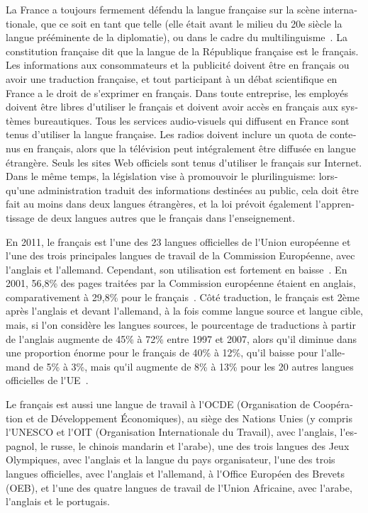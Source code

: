 \documentclass[]{../metanetpaper}
\begin{document}
\begin{french}
\begin{multicols}{2}
La France a toujours fermement défendu la langue française sur la
scène internationale, que ce soit en tant que telle (elle était avant
le milieu du 20e siècle la langue prééminente de la diplomatie), ou
dans le cadre du multilinguisme~\cite{multilinguisme}. La constitution
française dit que la langue de la République française est le
français. Les informations aux consommateurs et la publicité doivent
être en français ou avoir une traduction française, et tout
participant à un débat scientifique en France a le droit de s{\mbox
 '}exprimer en français. Dans toute entreprise, les employés doivent
être libres d{\mbox '}utiliser le français et doivent avoir accès en
français aux systèmes bureautiques. Tous les services audio-visuels
qui diffusent en France sont tenus d'utiliser la langue française. Les
radios doivent inclure un quota de contenus en français, alors que la
télévision peut intégralement être diffusée en langue étrangère. Seuls
les sites Web officiels sont tenus d{\mbox '}utiliser le français sur
Internet. Dans le même temps, la législation vise à promouvoir le
plurilinguisme: lorsqu{\mbox '}une administration traduit des
informations destinées au public, cela doit être fait au moins dans
deux langues étrangères, et la loi prévoit également l{\mbox '}apprentissage 
de deux langues autres que le français dans l{\mbox '}enseignement.

En 2011, le français est l{\mbox '}une des 23 langues officielles de
l{\mbox '}Union européenne et l{\mbox '}une des trois principales
langues de travail de la Commission Européenne, avec l{\mbox '}anglais
et l{\mbox '}allemand. Cependant, son utilisation est fortement en
baisse~\cite{baisse}. En 2001, 56,8\% des pages traitées par la
Commission européenne étaient en anglais, comparativement à 29,8\%
pour le français~\cite{comparativement}. Côté traduction, le français
est 2ème après l{\mbox '}anglais et devant l{\mbox '}allemand, à la
fois comme langue source et langue cible, mais, si l{\mbox '}on
considère les langues sources, le pourcentage de traductions à partir
de l{\mbox '}anglais augmente de 45\% à 72\% entre 1997 et 2007, alors
qu{\mbox '}il diminue dans une proportion énorme pour le français de
40\% à 12\%, qu{\mbox '}il baisse pour l{\mbox '}allemand de 5\% à
3\%, mais qu{\mbox '}il augmente de 8\% à 13\% pour les 20 autres
langues officielles de l{\mbox '}UE~\cite{dgt08}.

Le français est aussi une langue de travail à l{\mbox '}OCDE
(Organisation de Coopération et de Développement Économiques), au
siège des Nations Unies (y compris l{\mbox '}UNESCO et l{\mbox '}OIT
(Organisation Internationale du Travail), avec l{\mbox '}anglais,
l{\mbox '}espagnol, le russe, le chinois mandarin et l{\mbox '}arabe),
une des trois langues des Jeux Olympiques, avec l{\mbox '}anglais et
la langue du pays organisateur, l{\mbox '}une des trois langues
officielles, avec l{\mbox '}anglais et l{\mbox '}allemand, à l{\mbox
 '}Office Européen des Brevets (OEB), et l{\mbox '}une des quatre
langues de travail de l{\mbox '}Union Africaine, avec l{\mbox '}arabe,
l{\mbox '}anglais et le portugais.


\end{multicols}
\end{french}
\end{document}
